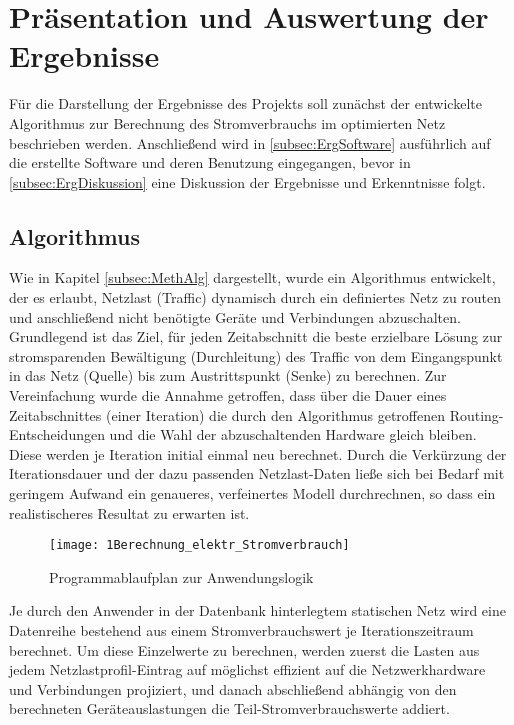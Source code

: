 
\section{Präsentation und Auswertung der Ergebnisse} \label{sec:Erg}
Für die Darstellung der Ergebnisse des Projekts soll zunächst der entwickelte Algorithmus zur Berechnung des Stromverbrauchs im optimierten Netz beschrieben werden. Anschließend wird in \ref{subsec:ErgSoftware} ausführlich auf die erstellte Software  und deren Benutzung eingegangen, bevor in \ref{subsec:ErgDiskussion} eine Diskussion der Ergebnisse und Erkenntnisse folgt.

\subsection{Algorithmus} \label{subsec:ErgAlg}
Wie in Kapitel \ref{subsec:MethAlg} dargestellt, wurde ein Algorithmus entwickelt, der es erlaubt, Netzlast (Traffic) dynamisch durch ein definiertes Netz zu routen und anschließend nicht benötigte Geräte und Verbindungen abzuschalten.
Grundlegend ist das Ziel, für jeden Zeitabschnitt die beste erzielbare Lösung zur stromsparenden Bewältigung (Durchleitung) des Traffic von dem Eingangspunkt in das Netz (Quelle) bis zum Austrittspunkt (Senke) zu berechnen. Zur Vereinfachung wurde die Annahme getroffen, dass über die Dauer eines Zeitabschnittes (einer Iteration) die durch den Algorithmus getroffenen Routing-Entscheidungen und die Wahl der abzuschaltenden Hardware gleich bleiben. Diese werden je Iteration initial einmal neu berechnet. Durch die Verkürzung der Iterationsdauer und der dazu passenden Netzlast-Daten ließe sich bei Bedarf mit geringem Aufwand ein genaueres, verfeinertes Modell durchrechnen, so dass ein realistischeres Resultat zu erwarten ist.


\begin{figure}[!ht]
	\centering
	\texttt{[image: 1Berechnung\_elektr\_Stromverbrauch]}
	\caption{Programmablaufplan zur Anwendungslogik}
	\label{fig:1Berechnung_elektr_Stromverbrauch}
\end{figure}


Je durch den Anwender in der Datenbank hinterlegtem statischen Netz wird eine Datenreihe bestehend aus einem Stromverbrauchswert je Iterationszeitraum berechnet.
Um diese Einzelwerte zu berechnen, werden zuerst die Lasten aus jedem Netzlastprofil-Eintrag auf möglichst effizient auf die Netzwerkhardware und Verbindungen projiziert, und danach abschließend abhängig von den berechneten Geräteauslastungen die Teil-Stromverbrauchswerte addiert.


